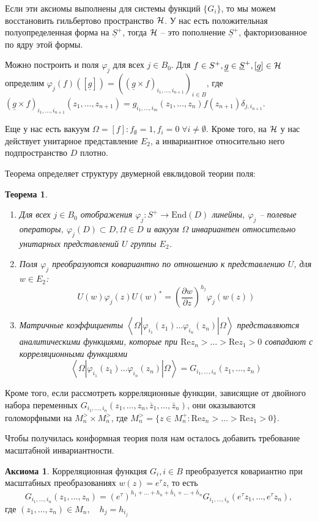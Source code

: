 \documentclass[a4paper,12pt]{article}
\newtheorem{theorem}{Теорема}
\theoremstyle{definition}
\newtheorem{axiom}{Аксиома}
\begin{document}
Если эти аксиомы выполнены для системы функций $\{G_i\}$, то мы можем
восстановить гильбертово пространство ${\cal H}$. У нас есть
положительная полуопределенная форма на $\underline{S}^+$, тогда
${\cal H}$ -- это пополнение $\underline{S}^+$, факторизованное по
ядру этой формы. 

Можно построить и поля $\varphi_j$ для всех $j\in B_0$. Для $f\in S^+,
\underline g\in \underline S^+, [\underline{g}]\in {\cal H}$ определим
$\varphi_j(f)([\underline{g}])=\left((\underline{g}\times
  f)_{i_1,\dots,i_{n+1}}\right)_{i\in B}$, где $(\underline{g}\times
f)_{i_1,\dots,i_{n+1}}(z_1,\dots, z_{n+1})=g_{i_1,\dots, i_m}
(z_1,\dots, z_n) f(z_{n+1}) \delta_{j,i_{n+1}}$.

Еще у нас есть вакуум $\Omega=[f]: f_{\emptyset}=1, f_i=0\; \forall
i\neq \emptyset$. Кроме того, на ${\cal H}$ у нас действует унитарное
представление $E_2$, а инвариантное относительно него подпространство
$D$ плотно. 

Теорема определяет структуру двумерной евклидовой теории поля:
\begin{theorem}
  \begin{enumerate}
  \item 
    Для всех $j\in B_{0}$ отображения $\varphi_{j}:S^{+}\to
    \mathrm{End}(D)$ линейны, $\varphi_{j}$ -- полевые операторы,
    $\varphi_{j}(D)\subset D, \Omega\in D$ и вакуум $\Omega$
    инвариантен относительно унитарных представлений $U$ группы
    $E_{2}$. 
  \item Поля $\varphi_{j}$ преобразуются ковариантно по отношению к представлению $U$, для $w\in E_{2}$:
    $$U(w)\varphi_{j}(z)U(w)^{*}=\left(\frac{\partial w}{\partial z}\right)^{h_{j}}\varphi_{j}(w(z))$$
  \item Матричные коэффициенты $\left<\Omega|\varphi_{i_{1}}(z_{1})\dots \varphi_{i_{n}}(z_{n})|\Omega\right>$ представляются аналитическими функциями, которые при $\mathrm{Re}z_{n}>\dots>\mathrm{Re}z_{1}>0$ совпадают с корреляционными функциями
    $$\left<\Omega|\varphi_{i_{1}}(z_{1})\dots \varphi_{i_{n}}(z_{n})|\Omega\right>=G_{i_{1},\dots,i_{n}}(z_{1},\dots,z_{n})$$
  \end{enumerate}
\end{theorem}
Кроме того, если рассмотреть корреляционные функции, зависящие от
двойного набора переменных $G_{i_1,\dots,i_n}(z_1,\dots, z_n,\bar
z_1,\dots,\bar z_n)$, они оказываются голоморфными на $M_n^>\times
M_n^>$, где $M_n^>=\{z\in M_n^+:\mathrm{Re}
z_n>\dots>\mathrm{Re}z_1>0\}$.

Чтобы получилась конформная теория поля нам осталось добавить
требование масштабной инвариантности. 
\begin{axiom}
  Корреляционная функция $G_{i}, i\in B$ преобразуется ковариантно при масштабных преобразованиях $w(z)=e^{\tau}z$, то есть
    $$G_{i_{1},\dots,i_{n}}(z_{1},\dots,z_{n})=\left(e^{\tau}\right)^{h_{1}+\dots+h_{n}+\bar{h}_{1}+\dots+\bar{h}_{n}} G_{i_{1},\dots,i_{n}}(e^{\tau} z_{1},\dots,e^{\tau} z_{n}),$$
  где $(z_{1},\dots,z_{n})\in M_{n},\quad h_{j}=h_{i_{j}}$
\end{axiom}
\end{document}
